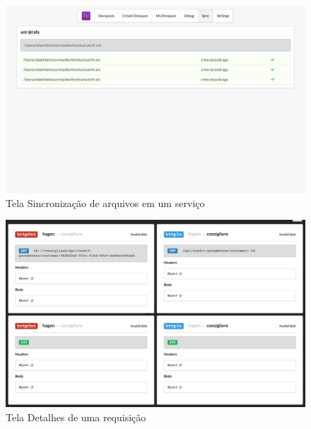 \begin{figure}[htb]
		\caption{\label{fig_frontend_sync}Tela Sincronização de arquivos em um serviço}
		\begin{center}
		\includegraphics[width=\textwidth,keepaspectratio]{pictures/frontend/frontend-sync.png}
		\end{center}
	\end{figure}
	
\begin{figure}[htb]
		\caption{\label{fig_frontend_tracing_details}Tela Detalhes de uma requisição}
		\begin{center}
		\includegraphics[width=\textwidth,keepaspectratio]{pictures/frontend/frontend-tracing-details.png}
		\end{center}
	\end{figure}
	
